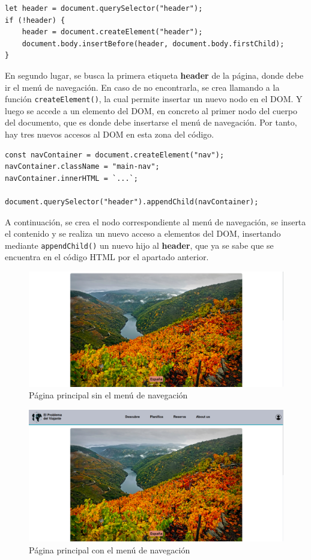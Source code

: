 \documentclass[11pt, a4paper]{book}
\begin{document}
    \begin{lstlisting}
let header = document.querySelector("header");
if (!header) {
	header = document.createElement("header");
	document.body.insertBefore(header, document.body.firstChild);
}
	\end{lstlisting}

	En segundo lugar, se busca la primera etiqueta \textbf{header} de la página, donde debe ir el menú de navegación. En caso de no encontrarla, se crea llamando a la función \texttt{createElement()}, la cual permite insertar un nuevo nodo en el DOM. Y luego se accede a un elemento del DOM, en concreto al primer nodo del cuerpo del documento, que es donde debe insertarse el menú de navegación.	Por tanto, hay tres nuevos accesos al DOM en esta zona del código. 
	
	\begin{lstlisting}
const navContainer = document.createElement("nav");
navContainer.className = "main-nav";
navContainer.innerHTML = `...`;

document.querySelector("header").appendChild(navContainer);
	\end{lstlisting}
	
	A continuación, se crea el nodo correspondiente al menú de navegación, se inserta el contenido y se realiza un nuevo acceso a elementos del DOM, insertando mediante \texttt{appendChild()} un nuevo hijo al \textbf{header}, que ya se sabe que se encuentra en el código HTML por el apartado anterior.
	
	\newpage
	
	\begin{figure} [H]
		\centering
		\includegraphics[width=\textwidth]{CSS/1-1 1920cut.png}
		\caption{Página principal sin el menú de navegación}
	\end{figure}
	\begin{figure} [H]
		\centering
		\includegraphics[width=\textwidth]{CSS/1-1 1920.png}
		\caption{Página principal con el menú de navegación}
	\end{figure}
\end{document}
